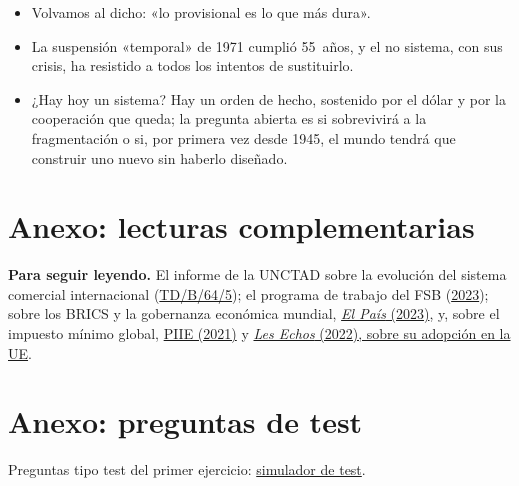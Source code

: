 \documentclass[11pt]{article}
\begin{document}
\begin{itemize}
  \begin{itemize}
  \item Volvamos al dicho: «lo provisional es lo que más dura».
  \item La suspensión «temporal» de 1971 cumplió 55~años, y el no sistema, con sus crisis, ha resistido a todos los intentos de sustituirlo.
  \item ¿Hay hoy un sistema? Hay un orden de hecho, sostenido por el dólar y por la cooperación que queda; la pregunta abierta es si sobrevivirá a la fragmentación o si, por primera vez desde 1945, el mundo tendrá que construir uno nuevo sin haberlo diseñado.
  \end{itemize}
\end{itemize}

\clearpage
\appendix

\section{Anexo: lecturas complementarias}\label{anexo:complementos}

\begin{anotaciones}
\textbf{Para seguir leyendo.} El informe de la UNCTAD sobre la evolución del sistema comercial internacional (\href{https://unctad.org/system/files/official-document/tdb64d5_es.pdf}{TD/B/64/5}); el programa de trabajo del FSB (\href{https://www.fsb.org/2023/03/fsb-work-programme-for-2023/}{2023}); sobre los BRICS y la gobernanza económica mundial, \href{https://elpais.com/economia/negocios/2023-09-03/brics-y-gobernanza-economica-mundial.html}{\emph{El País} (2023)}, y, sobre el impuesto mínimo global, \href{https://www.piie.com/publications/policy-briefs/international-tax-agreement-2021-why-its-needed-what-it-does-and-what}{PIIE (2021)} y \href{https://www.lesechos.fr/monde/europe/leurope-adopte-enfin-limpot-minimum-a-15-pour-les-entreprises-1889964}{\emph{Les Echos} (2022), sobre su adopción en la UE}.
\end{anotaciones}

\section{Anexo: preguntas de test}\label{anexo:test}

\begin{anotaciones}
Preguntas tipo test del primer ejercicio: \href{https://www.victorgutierrezmarcos.es/oposicion/temario/primer-ejercicio/test/simulador.html?tema=3.B.21}{simulador de test}.
\end{anotaciones}

\bibliografia
\end{document}
